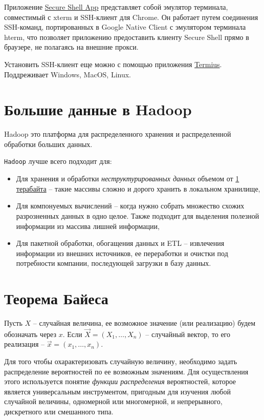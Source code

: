 \documentclass[%
	11pt,
	a4paper,
	utf8,
		]{article}
\begin{document}
Приложение \href{https://chrome.google.com/webstore/detail/secure-shell-app/pnhechapfaindjhompbnflcldabbghjo?hl=ru}{\ttfamily Secure Shell App} представляет собой эмулятор терминала, совместимый с xterm и SSH-клиент для Chrome. Он работает путем соединения SSH-команд, портированных в Google Native Client с эмулятором терминала hterm, что позволяет приложению предоставить клиенту Secure Shell прямо в браузере, не полагаясь на внешние прокси.

Установить SSH-клиент еще можно с помощью приложения \href{https://www.termius.com/}{Termius}. Поддреживает Windows, MacOS, Linux.


\section{Большие данные в Hadoop}

Hadoop это платформа для распределенного хранения и распределенной обработки больших данных.

\texttt{Hadoop} лучше всего подходит для:
\begin{itemize}
	\item Для хранения и обработки \emph{неструктурированных данных} объемом от \underline{1 терабайта} -- такие массивы сложно и дорого хранить в локальном хранилище,
	
	\item Для компонуемых вычислений -- когда нужно собрать множество схожих разрозненных данных в одно целое. Также подходит для выделения полезной информации из массива лишней информации,
	
	\item Для пакетной обработки, обогащения данных и ETL -- извлечения информации из внешних источников, ее переработки и очистки под потребности компании, последующей загрузки в базу данных.
\end{itemize}

\section{Теорема Байеса}

Пусть $ X $ -- случайная величина, ее возможное значение (или реализацию) будем обозначать через $ x $. Если $ \vec{X} = (X_1, \dots, X_n) $ -- случайный вектор, то его реализация -- $ \vec{x} = (x_1, \dots, x_n) $.

Для того чтобы охарактеризовать случайную величину, необходимо задать распределение вероятностей по ее возможным значениям. Для осуществления этого используется понятие \emph{функции распределения} вероятностей, которое является универсальным инструментом, пригодным для изучения любой случайной величины, одномерной или многомерной, и непрерывного, дискретного или смешанного типа.
\end{document}
